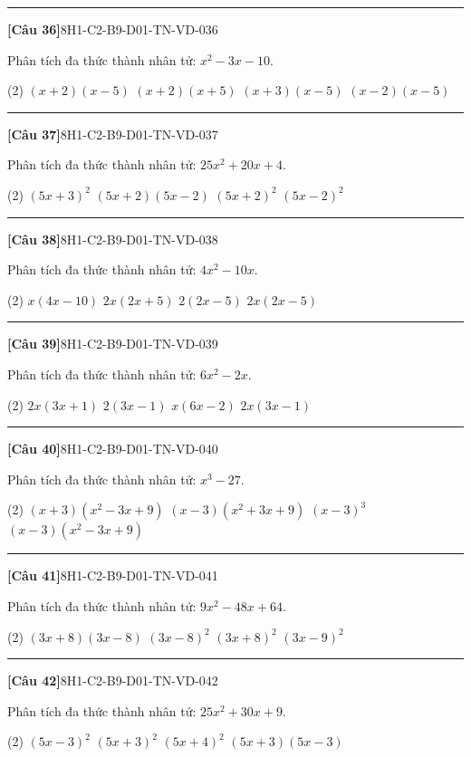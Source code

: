 \documentclass[12pt,a4paper]{article}
\newif\ifloigiai
\newenvironment{cauhoi}[2]{%
  \par\medskip\noindent\rule{\textwidth}{0.4pt}\par\nopagebreak
  \noindent\textbf{[#1]}\hfill{\scriptsize\ttfamily #2}\par\nopagebreak\smallskip}{\par}
\newcommand{\dapan}[1]{\ifloigiai\par\smallskip\noindent\textit{Đáp án:} \textbf{#1}\par\fi}
\begin{document}
\begin{cauhoi}{Câu 36}{8H1-C2-B9-D01-TN-VD-036}
Phân tích đa thức thành nhân tử: $x^{2} - 3x - 10$.
\begin{tasks}(2)
\task $(x + 2)(x - 5)$
\task $(x + 2)(x + 5)$
\task $(x + 3)(x - 5)$
\task $(x - 2)(x - 5)$
\end{tasks}
\dapan{A}
\end{cauhoi}
\begin{cauhoi}{Câu 37}{8H1-C2-B9-D01-TN-VD-037}
Phân tích đa thức thành nhân tử: $25x^{2} + 20x + 4$.
\begin{tasks}(2)
\task $(5x + 3)^{2}$
\task $(5x + 2)(5x - 2)$
\task $(5x + 2)^{2}$
\task $(5x - 2)^{2}$
\end{tasks}
\dapan{C}
\end{cauhoi}
\begin{cauhoi}{Câu 38}{8H1-C2-B9-D01-TN-VD-038}
Phân tích đa thức thành nhân tử: $4x^{2} - 10x$.
\begin{tasks}(2)
\task $x(4x - 10)$
\task $2x(2x + 5)$
\task $2(2x - 5)$
\task $2x(2x - 5)$
\end{tasks}
\dapan{D}
\end{cauhoi}
\begin{cauhoi}{Câu 39}{8H1-C2-B9-D01-TN-VD-039}
Phân tích đa thức thành nhân tử: $6x^{2} - 2x$.
\begin{tasks}(2)
\task $2x(3x + 1)$
\task $2(3x - 1)$
\task $x(6x - 2)$
\task $2x(3x - 1)$
\end{tasks}
\dapan{D}
\end{cauhoi}
\begin{cauhoi}{Câu 40}{8H1-C2-B9-D01-TN-VD-040}
Phân tích đa thức thành nhân tử: $x^{3}-27$.
\begin{tasks}(2)
\task $(x+3)(x^{2}-3x+9)$
\task $(x-3)(x^{2}+3x+9)$
\task $(x-3)^{3}$
\task $(x-3)(x^{2}-3x+9)$
\end{tasks}
\dapan{B}
\end{cauhoi}
\begin{cauhoi}{Câu 41}{8H1-C2-B9-D01-TN-VD-041}
Phân tích đa thức thành nhân tử: $9x^{2} - 48x + 64$.
\begin{tasks}(2)
\task $(3x + 8)(3x - 8)$
\task $(3x - 8)^{2}$
\task $(3x + 8)^{2}$
\task $(3x - 9)^{2}$
\end{tasks}
\dapan{B}
\end{cauhoi}
\begin{cauhoi}{Câu 42}{8H1-C2-B9-D01-TN-VD-042}
Phân tích đa thức thành nhân tử: $25x^{2} + 30x + 9$.
\begin{tasks}(2)
\task $(5x - 3)^{2}$
\task $(5x + 3)^{2}$
\task $(5x + 4)^{2}$
\task $(5x + 3)(5x - 3)$
\end{tasks}
\dapan{B}
\end{cauhoi}
\end{document}
